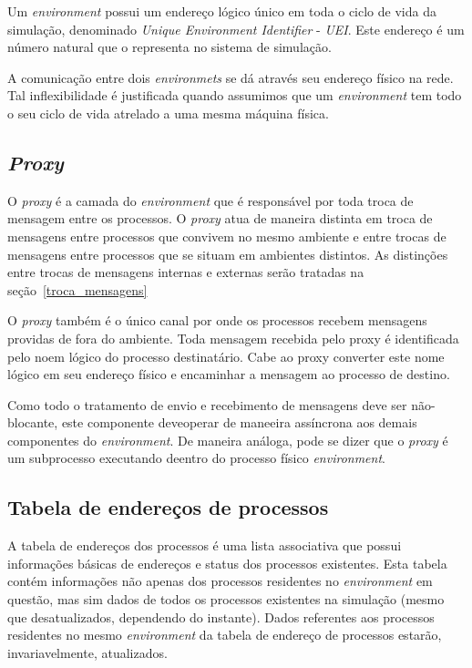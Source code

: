 Um \textit{environment} possui um endereço lógico único em toda o ciclo de vida da simulação, denominado \textit{Unique Environment Identifier} - \textit{UEI}. Este endereço é um número natural que o representa no sistema de simulação.

A comunicação entre dois \textit{environmets} se dá através seu endereço físico na rede. Tal inflexibilidade é justificada quando assumimos que um \textit{environment} tem todo o seu ciclo de vida atrelado a uma mesma máquina física.

\subsection{\textit{Proxy}}

O \textit{proxy} é a camada do \textit{environment} que é responsável por toda troca de mensagem entre os processos. O \textit{proxy} atua de maneira distinta em troca de mensagens entre processos que convivem no mesmo ambiente e entre trocas de mensagens entre processos que se situam em ambientes distintos. As distinções entre trocas de mensagens internas e externas serão tratadas na seção~\ref{troca_mensagens}

O \textit{proxy} também é o único canal por onde os processos recebem mensagens providas de fora do ambiente. Toda mensagem recebida pelo proxy é identificada pelo noem lógico do processo destinatário. Cabe ao proxy converter este nome lógico em seu endereço físico e encaminhar a mensagem ao processo de destino.

Como todo o tratamento de envio e recebimento de mensagens deve ser não-blocante, este componente deveoperar de maneeira assíncrona aos demais componentes do \textit{environment}. De maneira análoga, pode se dizer que o \textit{proxy} é um subprocesso executando deentro do processo físico \textit{environment}.

\subsection{Tabela de endereços de processos}

A tabela de endereços dos processos é uma lista associativa que possui informações básicas de endereços e status dos processos existentes. Esta tabela contém informações não apenas dos processos residentes no \textit{environment} em questão, mas sim dados de todos os processos existentes na simulação (mesmo que desatualizados, dependendo do instante). Dados referentes aos processos residentes no mesmo \textit{environment} da tabela de endereço de processos estarão, invariavelmente, atualizados.

